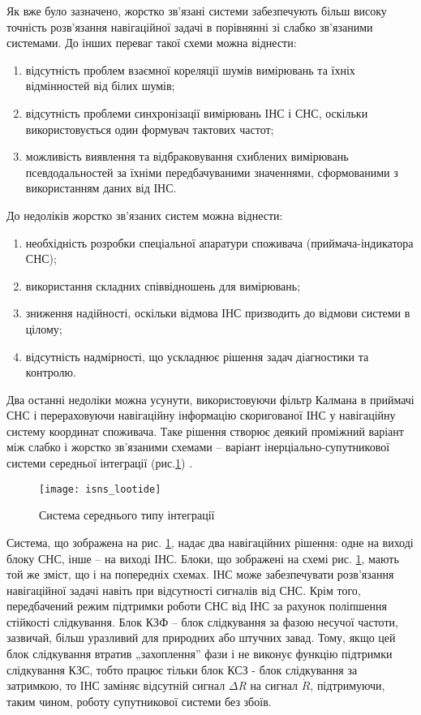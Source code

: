 Як вже було зазначено, жорстко зв'язані системи забезпечують більш високу точність 
розв'язання навігаційної задачі в порівнянні зі слабко зв'язаними системами. До інших 
переваг такої схеми можна віднести:

\begin{enumerate}
\item відсутність проблем взаємної кореляції шумів вимірювань та їхніх відмінностей 
від білих шумів;
\item відсутність проблеми синхронізації вимірювань ІНС і СНС, оскільки використовується 
один формувач тактових частот;
\item можливість виявлення та відбраковування схиблених вимірювань псевдодальностей 
за їхніми передбачуваними значеннями, сформованими з використанням даних від ІНС.
\end{enumerate}

До недоліків жорстко зв'язаних систем можна віднести:

\begin{enumerate}
\item необхідність розробки спеціальної апаратури споживача (приймача-індикатора СНС);
\item використання складних співвідношень для вимірювань;
\item зниження надійності, оскільки відмова ІНС призводить до відмови системи в цілому;
\item відсутність надмірності, що ускладнює рішення задач діагностики та контролю.
\end{enumerate}

Два 
останні недоліки можна усунути, використовуючи фільтр Калмана в приймачі СНС і перераховуючи 
навігаційну інформацію скоригованої ІНС у навігаційну систему координат споживача.   
Таке рішення створює деякий проміжний варіант між слабко і жорстко зв'язаними схемами -- варіант 
інерціально-супутникової системи середньої інтеграції (рис.\ref{fig:isns_lootide}) .

\begin{figure}[here]
\centering
\texttt{[image: isns\_lootide]}
\caption{Система середнього типу інтеграції}
\label{fig:isns_lootide}
\end{figure}

Система, що зображена на рис. \ref{fig:isns_lootide}, надає два навігаційних 
рішення: одне на виході блоку СНС, інше -- на виході ІНС. Блоки, що зображені на 
схемі рис. \ref{fig:isns_lootide}, мають той же зміст, що і на попередніх схемах. ІНС може забезпечувати 
розв'язання навігаційної задачі навіть при  відсутності сигналів від СНС. Крім того, 
передбачений режим підтримки роботи СНС від ІНС за рахунок поліпшення стійкості слідкування. 
Блок КЗФ -- блок слідкування за фазою  несучої частоти, зазвичай, більш уразливий 
для природних або штучних завад. Тому, якщо цей блок слідкування втратив „захоплення'' 
фази і не виконує функцію підтримки слідкування КЗС, тобто працює тільки блок КСЗ - 
блок слідкування за затримкою, то ІНС заміняє відсутній сигнал $\Delta$\textit{R} на 
сигнал $\dot{R} $, підтримуючи, таким чином, роботу супутникової системи 
без збоїв.

